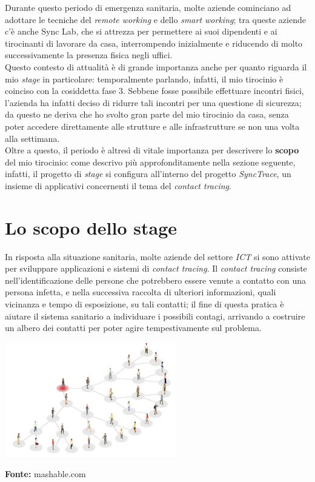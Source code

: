 Durante questo periodo di emergenza sanitaria, molte aziende cominciano ad adottare le tecniche del \textit{remote working} e dello \textit{smart working}; tra queste aziende c'è anche Sync Lab, che si attrezza per permettere ai suoi dipendenti e ai tirocinanti di lavorare da casa, interrompendo inizialmente e riducendo di molto successivamente la presenza fisica negli uffici. \\
Questo contesto di attualità è di grande importanza anche per quanto riguarda il mio \textit{stage} in particolare: temporalmente parlando, infatti, il mio tirocinio è coinciso con la cosiddetta fase 3. Sebbene fosse possibile effettuare incontri fisici, l'azienda ha infatti deciso di ridurre tali incontri per una questione di sicurezza; da questo ne deriva che ho svolto gran parte del mio tirocinio da casa, senza poter accedere direttamente alle strutture e alle infrastrutture se non una volta alla settimana. \\
Oltre a questo, il periodo è altresì di vitale importanza per descrivere lo \textbf{scopo} del mio tirocinio: come descrivo più approfonditamente nella sezione seguente, infatti, il progetto di \textit{stage} si configura all'interno del progetto \textit{SyncTrace}, un insieme di applicativi concernenti il tema del \textit{contact tracing}.


\section{Lo scopo dello stage}

In risposta alla situazione sanitaria, molte aziende del settore \textit{ICT} si sono attivate per sviluppare applicazioni e sistemi di \textit{contact tracing}. Il \textit{contact tracing} consiste nell'identificazione delle persone che potrebbero essere venute a contatto con una persona infetta, e nella successiva raccolta di ulteriori informazioni, quali vicinanza e tempo di esposizione, su tali contatti; il fine di questa pratica è aiutare il sistema sanitario a individuare i possibili contagi, arrivando a costruire un albero dei contatti per poter agire tempestivamente sul problema. \\

\begin{minipage}{\linewidth}
  \centering
    \includegraphics[height=5cm]{immagini/contacttracing}
  \caption*{\textbf{Fonte:} mashable.com}
\end{minipage} \\

